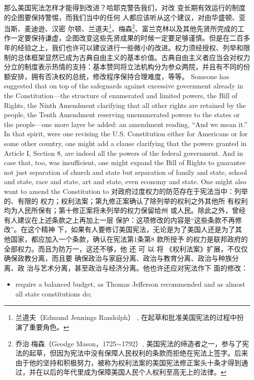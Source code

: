 \begin{paracol}{2}
\switchcolumn
那么美国宪法怎样才能得到改进？哈耶克警告我们，对改
变长期有效运行的制度的企图要保持警惕，而我们当中的任何
人都应该听从这个建议，对由华盛顿、亚当斯、麦迪逊、汉密
尔顿、兰道夫\footnote{兰道夫（Edmund  Jennings Randolph） , 在起草和批准美国宪法的过程中扮演了重要角色。}、梅森\footnote{乔治$\cdot$梅森（Geodge Mason，1725$\sim$1792）, 美国宪法的缔造者之一，参与了宪法的起草，但因为宪法中没有保障人民权利的条款而拒绝在宪法上签字。后来由于他的坚持和积极努力，被称为权利法案的美国宪法修正案头十条才得到通过，并在以后的年代里成为保障美国人民个人权利至高无上的法律。}、富兰克林以及其他先贤所完成的工作一定要保持谦虚，企图改变这些先贤成果的时候一定要足够谨慎。但是在二百多年的经验之上，我们也许可以建议进行一些微小的改进。权力须经授权、列举和限制的总体框架显然已成为古典自由主义的基本价值。古典自由主义者应当会对权力
分立的制度表示热情的支持：基本赞同将立法机构分为参众两院，并且有不同的份额安排，拥有否决权的总统，修改程序保持合理难度，等等。
\switchcolumn*
Someone has suggested that on top of the safeguards against
excessive government already in the Constitution---the structure of enumerated and limited powers, the Bill of Rights, the
Ninth Amendment clarifying that all other rights are retained
by the people, the Tenth Amendment reserving unenumerated
powers to the states or the people---one more layer be added:
an amendment reading, ``And we mean it.'' In that spirit, were
one revising the U.S. Constitution either for Americans or for
some other country, one might add a clause clarifying that the
powers granted in Article I, Section 8, are indeed all the powers of the federal government. And in case that, too, was insufficient, one might expand the Bill of Rights to guarantee not
just separation of church and state but separation of family and
state, school and state, race and state, art and state, even economy and state. One might also want to amend the Constitution to
\switchcolumn
对政府过度权力的防范存在于宪法当中：列举的、有限的
权力；权利法案；第九修正案确认了除列举的权利之外其他所
有权利均为人民所保有；第十修正案将未列举的权力保留给州
或人民。除此之外，曾经有人建议在上述条款之上再加上一层
保护：这项修改的内容是“这些条款不再修改”。在这个精神
下，如果有人要修订美国宪法，无论是为了美国人还是为了其
他国家，都应加入一个条款，确认在宪法第1条第8 款所授予
的权力是联邦政府的全部权力。而且为防万一，这还不够，他
还 可 以 将 《权利法案》扩展，不仅仅确保政教分离，而且要
确保政治与家庭分离、政治与教育分离、政治与种族分离、政
治与艺术分离，甚至政治与经济分离。他也许还应对宪法作下
面的修改：
\switchcolumn*
\begin{itemize}
	\item require a balanced budget, as Thomas Jefferson recommended and as almost all state constitutions do;

\end{itemize}
\end{paracol}

